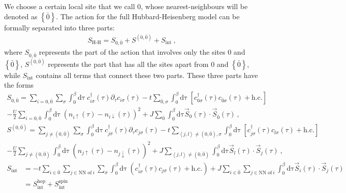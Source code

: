 We choose a certain local site that we call \(0\), whose nearest-neighbours will be denoted as \(\left\{ {\bar 0} \right\} \). The action for the full Hubbard-Heisenberg model can be formally separated into three parts:
\begin{equation}\begin{aligned}
S_\text{H-H} = S_{0,{\bar 0}} + S^{(0,{\bar 0})} + S_\text{int}~,
\end{aligned}\end{equation}
where \(S_{0,{\bar 0}}\) represents the part of the action that involves only the sites \(0\) and $\left\{ {\bar 0} \right\}$, \(S^{(0,{\bar 0})}\) represents the part that has all the sites apart from \(0\) and \(\left\{ {\bar 0} \right\} \), while \(S_\text{int}\) contains all terms that connect these two parts. These three parts have the forms
\begin{equation}\begin{aligned}
S_{0,{\bar 0}} = \sum_{i=0,{\bar 0}}\sum_\sigma \int_0^\beta\mathrm{d\tau}~c^\dagger_{i\sigma}(\tau)\partial_\tau c_{i\sigma}(\tau)  - t\sum_{{\bar 0},\sigma}\int_0^\beta\mathrm{d\tau}~\left[c^\dagger_{0\sigma}(\tau)c_{{\bar 0}\sigma}(\tau) + \text{h.c.}\right] \\
- \frac{U}{2}\sum_{i=0,{\bar 0}}\int_0^\beta\mathrm{d\tau}~\left(n_{i \uparrow}(\tau) - n_{i \downarrow}(\tau)\right)^2 + J\sum_{{\bar 0}}\int_0^\beta\mathrm{d\tau} \vec{S}_0(\tau)\cdot\vec{S}_{{\bar 0}}(\tau)~,
\end{aligned}\end{equation}
\begin{equation}\begin{aligned}
S^{(0,{\bar 0})} = \sum_{j\neq(0,{\bar 0})}\sum_\sigma \int_0^\beta\mathrm{d\tau}~c^\dagger_{j\sigma}(\tau)\partial_\tau c_{j\sigma}(\tau)  - t\sum_{\left<j,l\right>\neq (0,{\bar 0}),\sigma}\int_0^\beta\mathrm{d\tau}~\left[c^\dagger_{j\sigma}(\tau)c_{l\sigma}(\tau) + \text{h.c.}\right] \\
- \frac{U}{2}\sum_{j\neq(0,{\bar 0})}\int_0^\beta\mathrm{d\tau}~\left(n_{j\uparrow}(\tau) - n_{j\downarrow}(\tau)\right)^2 + J\sum_{\left<j,l\right>\neq(0,{\bar 0})}\int_0^\beta\mathrm{d\tau} \vec{S}_l(\tau)\cdot\vec{S}_j(\tau)~,
\end{aligned}\end{equation}
\begin{equation}\begin{aligned}
	S_\text{int} &= -t\sum_{i \in {\bar 0}}\sum_{j \in \text{NN of}~i}\sum_\sigma \int_0^\beta\mathrm{d\tau}~\left(c^\dagger_{i\sigma}(\tau) c_{j\sigma}(\tau) + \text{h.c.}\right) + J\sum_{i \in {\bar 0}}\sum_{j \in \text{NN of}~i}\int_0^\beta\mathrm{d\tau}\vec{S}_i(\tau)\cdot\vec{S}_j(\tau)\\
				 &= S_\text{int}^\text{hop} + S_\text{int}^\text{spin} 
\end{aligned}\end{equation}

